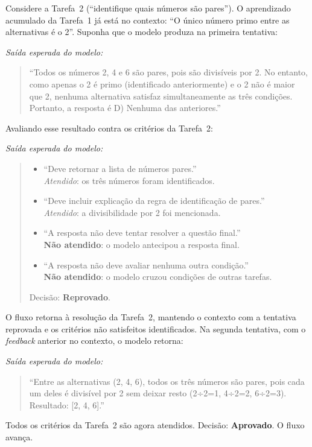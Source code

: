 \documentclass[a4paper,10pt,twocolumn]{article}
\newcommand{\saidaLLM}{%
  \smallskip\noindent\textit{Saída esperada do modelo:}\smallskip\par
}
\begin{document}
\begin{exemplo}
Considere a Tarefa~2 (``identifique quais números são pares''). O aprendizado acumulado da Tarefa~1 já está no contexto: ``O único número primo entre as alternativas é o 2''. Suponha que o modelo produza na primeira tentativa:

\saidaLLM

\begin{quote}
``Todos os números 2, 4 e 6 são pares, pois são divisíveis por 2. No entanto, como apenas o 2 é primo (identificado anteriormente) e o 2 não é maior que 2, nenhuma alternativa satisfaz simultaneamente as três condições. Portanto, a resposta é D) Nenhuma das anteriores.''
\end{quote}

Avaliando esse resultado contra os critérios da Tarefa~2:

\saidaLLM

\begin{quote}
\begin{itemize}
  \item ``Deve retornar a lista de números pares.'' \\ \textit{Atendido}: os três números foram identificados.
  \item ``Deve incluir explicação da regra de identificação de pares.'' \\ \textit{Atendido}: a divisibilidade por 2 foi mencionada.
  \item ``A resposta não deve tentar resolver a questão final.'' \\ \textbf{Não atendido}: o modelo antecipou a resposta final.
  \item ``A resposta não deve avaliar nenhuma outra condição.'' \\ \textbf{Não atendido}: o modelo cruzou condições de outras tarefas.
\end{itemize}
Decisão: \textbf{Reprovado}.
\end{quote}

O fluxo retorna à resolução da Tarefa~2, mantendo o contexto com a tentativa reprovada e os critérios não satisfeitos identificados. Na segunda tentativa, com o \textit{feedback} anterior no contexto, o modelo retorna:

\saidaLLM

\begin{quote}
``Entre as alternativas (2, 4, 6), todos os três números são pares, pois cada um deles é divisível por 2 sem deixar resto (2÷2=1, 4÷2=2, 6÷2=3). Resultado: [2, 4, 6].''
\end{quote}

Todos os critérios da Tarefa~2 são agora atendidos. Decisão: \textbf{Aprovado}. O fluxo avança.
\end{exemplo}
\end{document}
